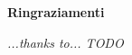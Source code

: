 \thispagestyle{empty}

\begin{center}
  {\bf \Huge Ringraziamenti}
\end{center}

\vspace{4cm}


\emph{
  ...thanks to... TODO
}

